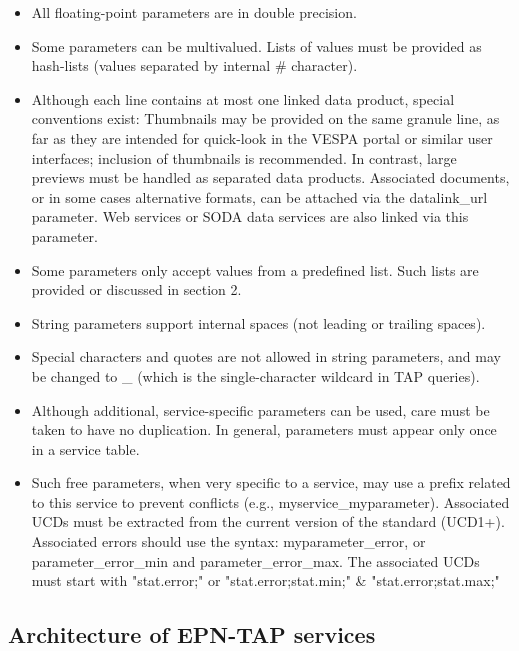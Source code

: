 \documentclass[11pt,a4paper]{ivoa}
\begin{document}
\begin{itemize}
\begin{itemize}
\item All floating-point parameters are in double precision.

\item Some parameters can be multivalued. Lists of values must be provided as hash-lists (values separated by internal \# character).

\item Although each line contains at most one linked data product, special conventions exist: 
Thumbnails may be provided on the same granule line, as far as they are intended for quick-look in the VESPA portal or similar user interfaces; inclusion of thumbnails is recommended. In contrast, large previews must be handled as separated data products.
Associated documents, or in some cases alternative formats, can be attached via the datalink\_url parameter. Web services or SODA data services are also linked via this parameter.

\item Some parameters only accept values from a predefined list. Such lists are provided or discussed in section 2.

\item String parameters support internal spaces (not leading or trailing spaces).

\item Special characters and quotes are not allowed in string parameters, and may be changed to \_ (which is the single-character wildcard in TAP queries). 

\item Although additional, service-specific parameters can be used, care must be taken to have no duplication. In general, parameters must appear only once in a service table.

\item Such free parameters, when very specific to a service, may use a prefix related to this service to prevent conflicts (e.g., myservice\_myparameter). Associated UCDs must be extracted from the current version of the standard (UCD1+).
Associated errors should use the syntax: myparameter\_error, or parameter\_error\_min and parameter\_error\_max. The associated UCDs must start with "stat.error;" or "stat.error;stat.min;" \& "stat.error;stat.max;"

\end{itemize}
\end{itemize}



\subsection{Architecture of EPN-TAP services}
\end{document}
